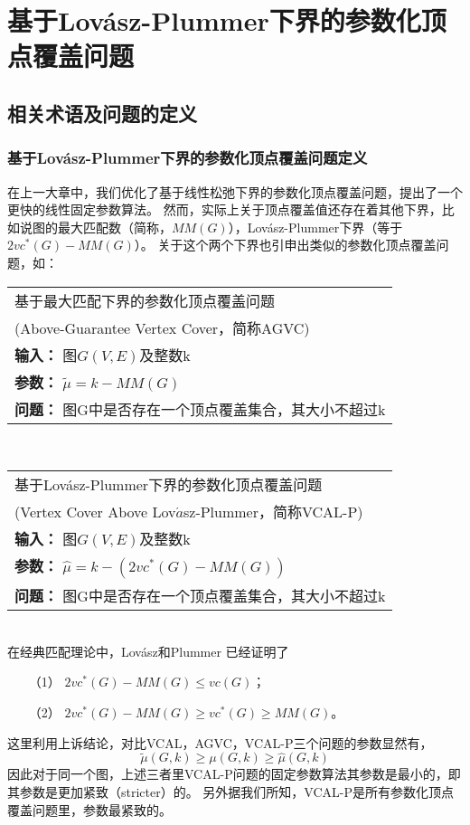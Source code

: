\chapter{基于Lov{\'a}sz-Plummer下界的参数化顶点覆盖问题}

\section{相关术语及问题的定义}

\subsection{基于Lov{\'a}sz-Plummer下界的参数化顶点覆盖问题定义}
在上一大章中，我们优化了基于线性松弛下界的参数化顶点覆盖问题，提出了一个更快的线性固定参数算法。
然而，实际上关于顶点覆盖值还存在着其他下界，比如说图的最大匹配数（简称，$MM(G)$），Lov{\'a}sz-Plummer下界（等于$2vc^*(G) - MM(G)$）。
关于这个两个下界也引申出类似的参数化顶点覆盖问题，如：\\

\begin{tabular}{| p{0.9\headwidth} |}
  \hline
  基于最大匹配下界的参数化顶点覆盖问题\\(Above-Guarantee Vertex Cover，简称AGVC) \\
  \textbf{输入：} 图$G(V, E)$及整数k \\
  \textbf{参数：} $\tilde{\mu} = k - MM(G)$\\
  \textbf{问题：} 图G中是否存在一个顶点覆盖集合，其大小不超过k\\
  \hline
\end{tabular} \vspace{0.5cm} \\


\begin{tabular}{| p{0.9\headwidth} |}
  \hline
  基于Lov{\'a}sz-Plummer下界的参数化顶点覆盖问题\\(Vertex Cover Above Lov$\acute{a}$sz-Plummer，简称VCAL-P) \\
  \textbf{输入：} 图$G(V, E)$及整数k \\
  \textbf{参数：} $\hat{\mu} = k - (2vc^*(G) - MM(G))$\\
  \textbf{问题：} 图G中是否存在一个顶点覆盖集合，其大小不超过k\\
  \hline
\end{tabular} \vspace{0.5cm} \\

在经典匹配理论中，Lov{\'a}sz和Plummer 已经证明了
\begin{itemize}
  \item[（1）]$2vc^*(G) - MM(G) \le vc(G)$；
  \item[（2）]$2vc^*(G) - MM(G) \ge vc^*(G) \ge MM(G)$。
\end{itemize}
这里利用上诉结论，对比VCAL，AGVC，VCAL-P三个问题的参数显然有，\[\tilde\mu(G, k) \ge \mu(G,k) \ge \hat\mu(G,k)\]
因此对于同一个图，上述三者里VCAL-P问题的固定参数算法其参数是最小的，即其参数是更加紧致（stricter）的。
另外据我们所知，VCAL-P是所有参数化顶点覆盖问题里，参数最紧致的。


